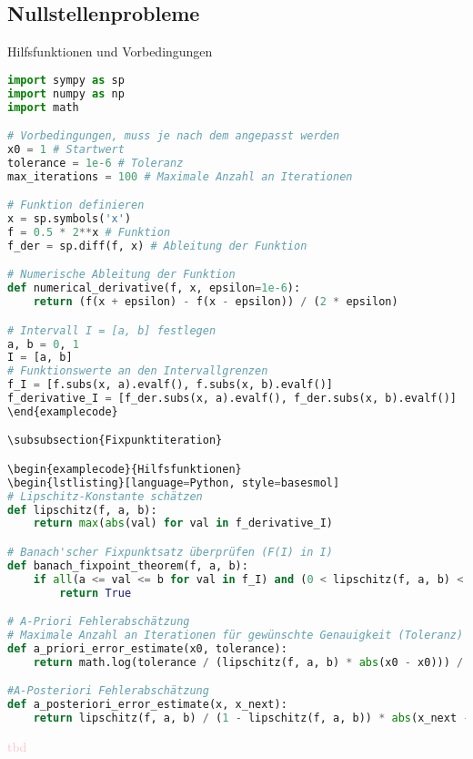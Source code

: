 \subsection{Nullstellenprobleme}

\begin{examplecode}{Hilfsfunktionen und Vorbedingungen}
\begin{lstlisting}[language=Python, style=basesmol]
import sympy as sp
import numpy as np
import math

# Vorbedingungen, muss je nach dem angepasst werden
x0 = 1 # Startwert
tolerance = 1e-6 # Toleranz
max_iterations = 100 # Maximale Anzahl an Iterationen

# Funktion definieren
x = sp.symbols('x')
f = 0.5 * 2**x # Funktion
f_der = sp.diff(f, x) # Ableitung der Funktion

# Numerische Ableitung der Funktion 
def numerical_derivative(f, x, epsilon=1e-6):
    return (f(x + epsilon) - f(x - epsilon)) / (2 * epsilon)

# Intervall I = [a, b] festlegen
a, b = 0, 1
I = [a, b]
# Funktionswerte an den Intervallgrenzen
f_I = [f.subs(x, a).evalf(), f.subs(x, b).evalf()] 
f_derivative_I = [f_der.subs(x, a).evalf(), f_der.subs(x, b).evalf()]
\end{examplecode}

\subsubsection{Fixpunktiteration}

\begin{examplecode}{Hilfsfunktionen}
\begin{lstlisting}[language=Python, style=basesmol]
# Lipschitz-Konstante schätzen
def lipschitz(f, a, b):
    return max(abs(val) for val in f_derivative_I)

# Banach'scher Fixpunktsatz überprüfen (F(I) in I)
def banach_fixpoint_theorem(f, a, b):
    if all(a <= val <= b for val in f_I) and (0 < lipschitz(f, a, b) < 1):
        return True

# A-Priori Fehlerabschätzung 
# Maximale Anzahl an Iterationen für gewünschte Genauigkeit (Toleranz)
def a_priori_error_estimate(x0, tolerance):
    return math.log(tolerance / (lipschitz(f, a, b) * abs(x0 - x0))) / math.log(lipschitz(f, a, b))

#A-Posteriori Fehlerabschätzung
def a_posteriori_error_estimate(x, x_next):
    return lipschitz(f, a, b) / (1 - lipschitz(f, a, b)) * abs(x_next - x)
\end{lstlisting}

\textcolor{pink}{tbd} %
\end{examplecode}

